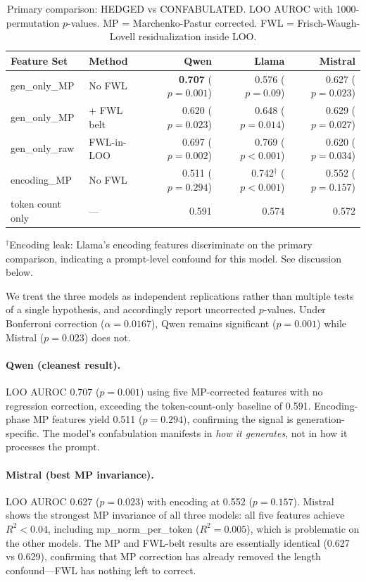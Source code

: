 \begin{table}[H]
\centering
\caption{Primary comparison: HEDGED vs CONFABULATED. LOO AUROC with
  1000-permutation $p$-values. MP = Marchenko-Pastur corrected.
  FWL = Frisch-Waugh-Lovell residualization inside LOO.}
\label{tab:primary}
\begin{tabular}{llrrr}
\toprule
Feature Set & Method & Qwen & Llama & Mistral \\
\midrule
gen\_only\_MP & No FWL & \textbf{0.707} ($p{=}0.001$) & 0.576 ($p{=}0.09$) & 0.627 ($p{=}0.023$) \\
gen\_only\_MP & + FWL belt & 0.620 ($p{=}0.023$) & 0.648 ($p{=}0.014$) & 0.629 ($p{=}0.027$) \\
gen\_only\_raw & FWL-in-LOO & 0.697 ($p{=}0.002$) & 0.769 ($p{<}0.001$) & 0.620 ($p{=}0.034$) \\
encoding\_MP & No FWL & 0.511 ($p{=}0.294$) & 0.742$^{\dagger}$ ($p{<}0.001$) & 0.552 ($p{=}0.157$) \\
token count only & --- & 0.591 & 0.574 & 0.572 \\
\bottomrule
\end{tabular}
{\small $^{\dagger}$Encoding leak: Llama's encoding features discriminate
on the primary comparison, indicating a prompt-level confound for this
model. See discussion below.}
\end{table}

We treat the three models as independent replications rather than
multiple tests of a single hypothesis, and accordingly report uncorrected
$p$-values. Under Bonferroni correction ($\alpha = 0.0167$), Qwen
remains significant ($p = 0.001$) while Mistral ($p = 0.023$) does not.

\paragraph{Qwen (cleanest result).}
LOO AUROC 0.707 ($p = 0.001$) using five MP-corrected features with no
regression correction, exceeding the token-count-only baseline of 0.591.
Encoding-phase MP features yield 0.511 ($p = 0.294$), confirming the
signal is generation-specific. The model's confabulation manifests in
\emph{how it generates}, not in how it processes the prompt.

\paragraph{Mistral (best MP invariance).}
LOO AUROC 0.627 ($p = 0.023$) with encoding at 0.552 ($p = 0.157$).
Mistral shows the strongest MP invariance of all three models: all five
features achieve $R^2 < 0.04$, including mp\_norm\_per\_token
($R^2 = 0.005$), which is problematic on the other models. The MP and
FWL-belt results are essentially identical (0.627 vs 0.629), confirming
that MP correction has already removed the length confound---FWL has
nothing left to correct.

